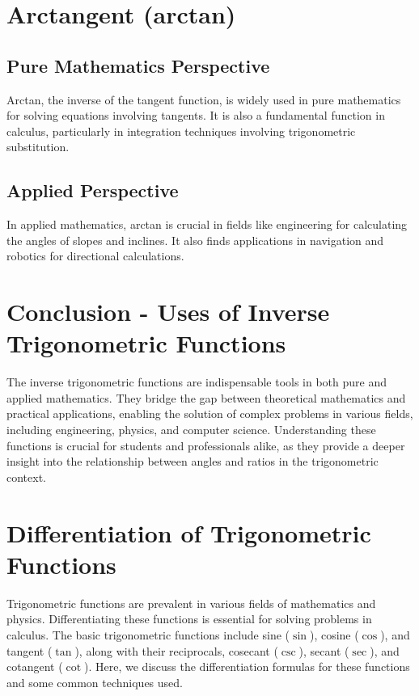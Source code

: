 \documentclass[a4paper,12pt]{book}
\newcounter{problem}
\begin{document}
\section*{Arctangent (arctan)}
\subsection*{Pure Mathematics Perspective}
Arctan, the inverse of the tangent function, is widely used in pure mathematics for solving equations involving tangents. It is also a fundamental function in calculus, particularly in integration techniques involving trigonometric substitution.

\subsection*{Applied Perspective}
In applied mathematics, arctan is crucial in fields like engineering for calculating the angles of slopes and inclines. It also finds applications in navigation and robotics for directional calculations.

\section*{Conclusion - Uses of Inverse Trigonometric Functions}
The inverse trigonometric functions are indispensable tools in both pure and applied mathematics. They bridge the gap between theoretical mathematics and practical applications, enabling the solution of complex problems in various fields, including engineering, physics, and computer science. Understanding these functions is crucial for students and professionals alike, as they provide a deeper insight into the relationship between angles and ratios in the trigonometric context.

\section{Differentiation of Trigonometric Functions}

Trigonometric functions are prevalent in various fields of mathematics and physics. Differentiating these functions is essential for solving problems in calculus. The basic trigonometric functions include sine (\(\sin\)), cosine (\(\cos\)), and tangent (\(\tan\)), along with their reciprocals, cosecant (\(\csc\)), secant (\(\sec\)), and cotangent (\(\cot\)). Here, we discuss the differentiation formulas for these functions and some common techniques used.
\end{document}
